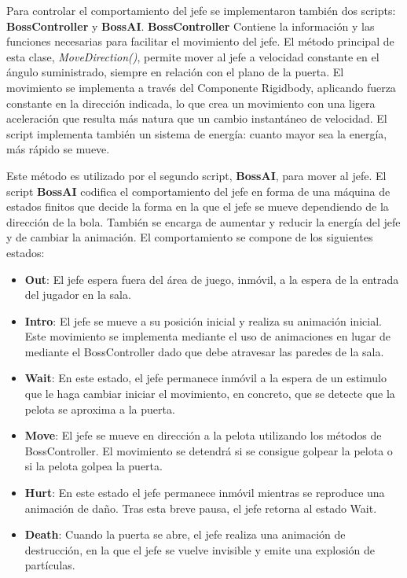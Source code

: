 Para controlar el comportamiento del jefe se implementaron también dos scripts: \textbf{BossController} y \textbf{BossAI}. \textbf{BossController} Contiene la información y las funciones necesarias para facilitar el movimiento del jefe. El método principal de esta clase, \textit{MoveDirection()}, permite mover al jefe a velocidad constante en el ángulo suministrado, siempre en relación con el plano de la puerta. El movimiento se implementa a través del Componente Rigidbody, aplicando fuerza constante en la dirección indicada, lo que crea un movimiento con una ligera aceleración que resulta más natura que un cambio instantáneo de velocidad. El script implementa también un sistema de energía: cuanto mayor sea la energía, más rápido se mueve.

Este método es utilizado por el segundo script, \textbf{BossAI}, para mover al jefe. El script \textbf{BossAI} codifica el comportamiento del jefe en forma de una máquina de estados finitos que decide la forma en la que el jefe se mueve dependiendo de la dirección de la bola. También se encarga de aumentar y reducir la energía del jefe y de cambiar la animación. El comportamiento se compone de los siguientes estados:
 \begin{itemize}
	\item \textbf{Out}: El jefe espera fuera del área de juego, inmóvil, a la espera de la entrada del jugador en la sala.
	\item \textbf{Intro}: El jefe se mueve a su posición inicial y realiza su animación inicial. Este movimiento se implementa mediante el uso de animaciones en lugar de mediante el BossController dado que debe atravesar las paredes de la sala.
	\item \textbf{Wait}: En este estado, el jefe permanece inmóvil a la espera de un estimulo que le haga cambiar iniciar el movimiento, en concreto, que se detecte que la pelota se aproxima a la puerta.
	\item \textbf{Move}: El jefe se mueve en dirección a la pelota utilizando los métodos de BossController. El movimiento se detendrá si se consigue golpear la pelota o si la pelota golpea la puerta. 
	\item \textbf{Hurt}: En este estado el jefe permanece inmóvil mientras se reproduce una animación de daño. Tras esta breve pausa, el jefe retorna al estado Wait.
	\item \textbf{Death}: Cuando la puerta se abre, el jefe realiza una animación de destrucción, en la que el jefe se vuelve invisible y emite una explosión de partículas. 
\end{itemize}


